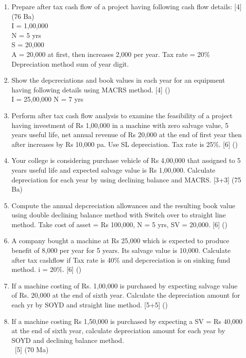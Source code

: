 \documentclass[12pt]{article}
\newcommand{\enter}{\\\textcolor{white}{1}}
\begin{document}
\begin{enumerate}
			\item Prepare after tax cash flow of a project having following cash flow details: \hfill [4] (76 Ba)\\
			I = 1,00,000\\
			N = 5 yrs\\
			S = 20,000\\
			A = 20,000 at first, then increases 2,000 per year.
			Tax rate = 20\%
			Depreciation method sum of year digit.

			\item Show the depcreciations and book values in each year for an equipment having following details using MACRS method. \hfill [4] ()\\
			I = 25,00,000
			N = 7 yrs

			\item Perform after tax cash flow analysis to examine the feasibility of a project having investment of Rs 1,00,000 in a machine with zero salvage value, 5 years useful life, net annual revenue of Rs 20,000 at the end of first year then after increases by Rs 10,000 pa. Use SL depreciation. Tax rate is 25\%. \hfill [6] ()

			\item Your college is considering purchase vehicle of Rs 4,00,000 that assigned to 5 years useful life and expected salvage value is Rs 1,00,000. Calculate depreciation for each year by using declining balance and MACRS. \hfill [3+3] (75 Ba)

			\item Compute the annual depcreciation allowances and the resulting book value using double declining balance method with Switch over to straight line method. Take cost of asset = Rs 100,000, N = 5 yrs, SV = 20,000. \hfill [6] ()

			\item A company bought a machine at Rs 25,000 which is expected to produce benefit of 8,000 per year for 5 years. Its salvage value is 10,000. Calculate after tax cashflow if Tax rate is 40\% and depcreciation is on sinking fund method. i = 20\%. \hfill [6] ()

			\item If a machine costing of Rs. 1,00,000 is purchased by expecting salvage value of Rs. 20,000 at the end of sixth year. Calculate the depreciation amount for each yr by SOYD and straight line method. \hfill [5+5] ()

			\item If a machine costing Rs 1,50,000 is purchased by expecting a SV = Rs 40,000 at the end of sixth year, calculate depreciation amount for each year by SOYD and declining balance method.
			\enter\hfill [5] (70 Ma)


\end{enumerate}
\end{document}
